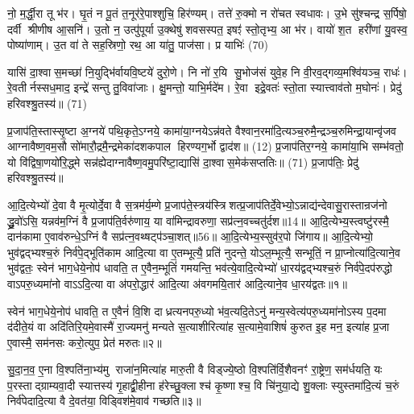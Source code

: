 नो॒ म॒र्द्धी॒रा तू भ॑र। घृ॒तं न पू॒तं त॒नूर॑रे॒पाश्शुचि॒ हिर॑ण्यम्। तत्ते॑ रु॒क्मो न रो॑चत स्वधावः। उ॒भे सु॑श्चन्द्र स॒र्पिषो॒ दर्वी श्रीणीष आ॒सनि॑। उ॒तो न॒ उत्पु॑पूर्या उ॒क्थेषु॑ शवसस्पत॒ इषꣵ॑ स्तो॒तृभ्य॒ आ भ॑र। वायो॑ श॒त हरी॑णां यु॒वस्व॒ पोष्या॑णाम्। उ॒त वा॑ ते सह॒स्रिणो॒ रथ॒ आ या॑तु॒ पाज॑सा। प्र याभिः॑ (70)

यासि॑ दा॒श्वास॒मच्छा॑ नि॒युद्भि॑र्वायवि॒ष्टये॑ दुरो॒णे। नि नो॑ र॒यि सु॒भोज॑सं युवे॒ह नि वी॒रव॒द्गव्य॒मश्वि॑यञ्च॒ राधः॑। रे॒वतीर्नस्सध॒माद॒ इन्द्रे॑ सन्तु तु॒विवा॑जाः। क्षु॒मन्तो॒ याभि॒र्मदे॑म। रे॒वा इद्रे॒वतः॑ स्तो॒ता स्यात्त्वाव॑तो म॒घोनः॑। प्रेदु॑ हरिवश्श्रु॒तस्य॑॥ (71)

{\anuvakamend[जि॒नोषि॑ देभुः॒ प्र ह॒व्यं ब॒भूथ॒ मा याभि॑श्चत्वारि॒ꣳ॒शच्च॑॥ (12)]}

{\scriptsize प्र॒जाप॑ति॒स्तास्सृ॒ष्टा अ॒ग्नये॑ पथि॒कृते॒ऽग्नये॒ कामा॑या॒ग्नयेऽन्न॑वते वैश्वान॒रमा॑दि॒त्यञ्च॒रुमै॒न्द्रञ्च॒रुमिन्द्रा॒यान्वृ॑जव आग्नावैष्ण॒वम॒सौ सो॑मारौ॒द्रमै॒न्द्रमेका॑दशकपाल हिरण्यग॒र्भो द्वाद॑श॥ (12) प्र॒जाप॑तिर॒ग्नये॒ कामा॑या॒भि सम्भ॑वतो॒ यो वि॑द्विषा॒णयो॑रि॒द्ध्मे सन्न॑ह्येदाग्नावैष्ण॒वमु॒परि॑ष्टा॒द्यासि॑ दा॒श्वास॒मेक॑सप्ततिः॥ (71) प्र॒जाप॑तिः॒ प्रेदु॑ हरिवश्श्रु॒तस्य॑॥}


{\scriptsize {आ॒दि॒त्येभ्यो॑ दे॒वा वै मृ॒त्योर्दे॒वा वै स॒त्रम॑र्य॒म्णे प्र॒जाप॑ते॒स्त्रय॑स्त्रिशत्प्र॒जाप॑तिर्दे॒वेभ्यो॒ऽन्नाद्य॑न्देवासु॒रास्तान्रज॑नो द्ध्रु॒वो॑ऽसि॒ यन्नव॑म॒ग्निं वै प्र॒जाप॑ति॒र्वरु॑णाय॒ या वा॑मिन्द्रावरुणा॒ सप्र॑त्न॒वच्चतु॑र्दश॥14॥ आ॒दि॒त्येभ्य॒स्त्वष्टु॑रस्मै॒ दान॑कामा ए॒वाव॑रुन्धे॒ऽग्निं वै सप्र॑त्न॒वथ्षट्प॑ञ्चा॒शत्॥56॥ आ॒दि॒त्येभ्य॒स्सुव॑र॒पो जि॑गाय॥}}
\setcounter{anuvakam}{0}
आ॒दि॒त्येभ्यो॒ भुव॑द्वद्भ्यश्च॒रुं निर्व॑पे॒द्भूति॑काम आदि॒त्या वा ए॒तम्भूत्यै॒ प्रति॑ नुदन्ते॒ योऽल॒म्भूत्यै॒ सन्भूतिं॒ न प्रा॒प्नोत्या॑दि॒त्याने॒व भुव॑द्वतः॒ स्वेन॑ भाग॒धेये॒नोप॑ धावति॒ त ए॒वैन॒म्भूतिं॑ गमयन्ति॒ भव॑त्ये॒वादि॒त्येभ्यो॑ धा॒रय॑द्वद्भ्यश्च॒रुं निर्व॑पे॒दप॑रुद्धो वाऽपरु॒ध्यमा॑नो वाऽऽदि॒त्या वा अ॑परो॒द्धार॑ आदि॒त्या अ॑वगमयि॒तार॑ आदि॒त्याने॒व धा॒रय॑द्वतः॥१॥

स्वेन॑ भाग॒धेये॒नोप॑ धावति॒ त ए॒वैनं॑ वि॒शि दाध्रत्यनपरु॒ध्यो भ॑व॒त्यदि॒तेऽनु॑ मन्य॒स्वेत्य॑परु॒ध्यमा॑नोऽस्य प॒दमा द॑दीते॒यं वा अदि॑तिरि॒यमे॒वास्मै॑ रा॒ज्यमनु॑ मन्यते स॒त्याशीरित्या॑ह स॒त्यामे॒वाशिषं॑ कुरुत इ॒ह मन॒ इत्या॑ह प्र॒जा ए॒वास्मै॒ सम॑नसः करो॒त्युप॒ प्रेत॑ मरुतः॥२॥

सु॒दा॒न॒व॒ ए॒ना वि॒श्पति॑ना॒भ्य॑मु राजा॑न॒मित्या॑ह मारु॒ती वै विड्ज्ये॒ष्ठो वि॒श्पति॑र्वि॒शैवनꣳ॑ रा॒ष्ट्रेण॒ सम॑र्धयति॒ यः प॒रस्ताद्ग्राम्यवा॒दी स्यात्तस्य॑ गृ॒हाद्व्री॒हीना ह॑रेच्छु॒क्लाश्च॑ कृ॒ष्णाश्च॒ वि चि॑नुया॒द्ये शु॒क्लाः स्युस्तमा॑दि॒त्यं च॒रुं निर्व॑पेदादि॒त्या वै दे॒वत॑या॒ विड्विश॑मे॒वाव॑ गच्छति॥३॥

